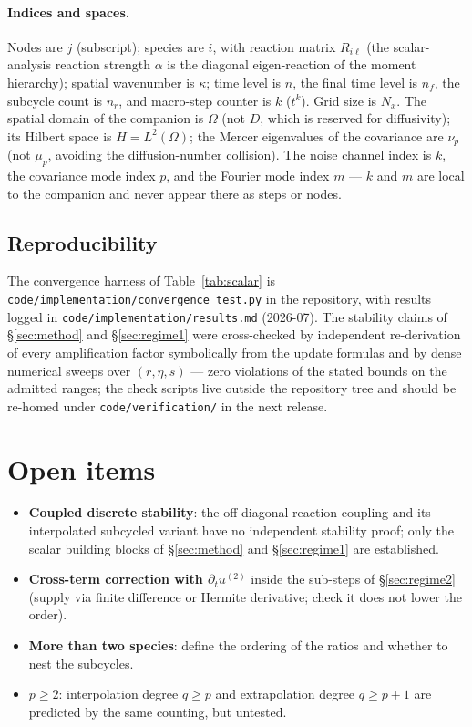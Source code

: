 \paragraph{Indices and spaces.} Nodes are $j$ (subscript); species are $i$,
with reaction matrix $R_{i\ell}$ (the scalar-analysis reaction strength
$\alpha$ is the diagonal eigen-reaction of the moment hierarchy); spatial
wavenumber is $\kappa$; time level is $n$, the final time level is $n_f$, the
subcycle count is $n_r$, and macro-step counter is $k$ ($t^k$). Grid size is
$N_x$. The spatial domain of the companion \secStochX{} is $\Omega$ (not $D$,
which is reserved for diffusivity); its Hilbert space is $H=L^2(\Omega)$; the
Mercer eigenvalues of the covariance are $\nu_p$ (not $\mu_p$, avoiding the
diffusion-number collision). The noise channel index is $k$, the covariance
mode index $p$, and the Fourier mode index $m$ --- $k$ and $m$ are local to
the companion \secStochX{} and never appear there as steps or nodes.

\subsection{Reproducibility}\label{app:repro}

The convergence harness of Table~\ref{tab:scalar} is
\texttt{code/implementation/convergence\_test.py} in the repository, with
results logged in \texttt{code/implementation/results.md} (2026-07). The
stability claims of \S\ref{sec:method} and \S\ref{sec:regime1} were
cross-checked by independent re-derivation of every amplification factor
symbolically from the update formulas and by dense numerical sweeps over
$(r,\eta,s)$ --- zero violations of the stated bounds on the admitted ranges;
the check scripts live outside the repository tree and should be re-homed
under \texttt{code/verification/} in the next release.

\section{Open items}\label{sec:open}

\begin{itemize}
\item \textbf{Coupled discrete stability}\label{open:stab}: the
off-diagonal reaction coupling and its interpolated subcycled variant have no
independent stability proof; only the scalar building blocks of
\S\ref{sec:method} and \S\ref{sec:regime1} are established.
\item \textbf{Cross-term correction with $\partial_t u^{(2)}$} inside the
sub-steps of \S\ref{sec:regime2} (supply via finite difference or Hermite
derivative; check it does not lower the order).
\item \textbf{More than two species}: define the ordering of the ratios and
whether to nest the subcycles.
\item \textbf{$p\ge 2$}: interpolation degree $q \ge p$ and extrapolation
degree $q \ge p+1$ are predicted by the same counting, but untested.
\end{itemize}
